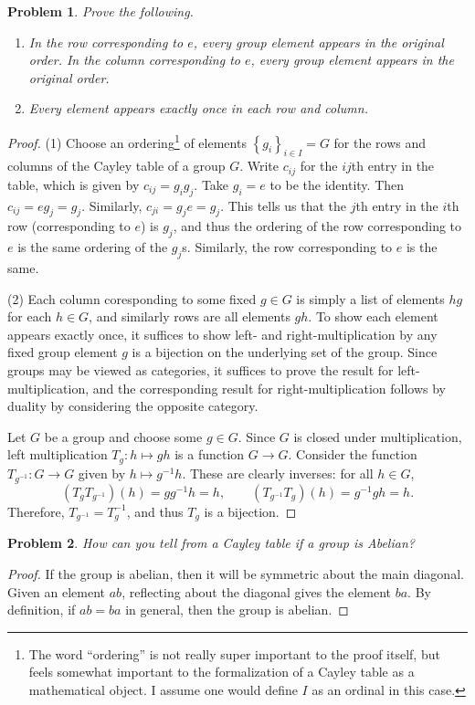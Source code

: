 \documentclass[11pt, letterpaper]{article}
\theoremstyle{plain}
\newtheorem{problem}{Problem}[section]
\begin{document}
\begin{problem}
	Prove the following.
	\begin{enumerate}
		\item In the row corresponding to $e$, every group element appears in the original order. In the column corresponding to $e$, every group element appears in the original order.
		\item Every element appears exactly once in each row and column.
	\end{enumerate}
\end{problem}
\begin{proof}
	(1) Choose an ordering\footnote{The word ``ordering'' is not really super important to the proof itself, but feels somewhat important to the formalization of a Cayley table as a mathematical object. I assume one would define $I$ as an ordinal in this case.} of elements $\left\{ g_i \right\}_{i\in I} =G$ for the rows and columns of the Cayley table of a group $G$. Write $c_{ij} $ for the $ij$th entry in the table, which is given by $c_{ij} =g_ig_j$. Take $g_i=e$ to be the identity. Then $c_{ij} =eg_j=g_j$. Similarly, $c_{ji} =g_je=g_j$. This tells us that the $j$th entry in the $i$th row (corresponding to $e$) is $g_j$, and thus the ordering of the row corresponding to $e$ is the same ordering of the $g_j$s. Similarly, the row corresponding to $e$ is the same.

	(2) Each column coresponding to some fixed $g\in G$ is simply a list of elements $hg$ for each $h\in G$, and similarly rows are all elements $gh$. To show each element appears exactly once, it suffices to show left- and right-multiplication by any fixed group element $g$ is a bijection on the underlying set of the group. Since groups may be viewed as categories, it suffices to prove the result for left-multiplication,  and the corresponding result for right-multiplication follows by duality by considering the opposite category.

	Let $G$ be a group and choose some $g\in G$. Since $G$ is closed under multiplication, left multiplication $T_g : h\mapsto gh$ is a function $G\to G$. Consider the function $T_{g^{-1} } : G \to G$ given by $h\mapsto g^{-1} h$. These are clearly inverses: for all $h\in G$,
	\[
		(T_gT_{g^{-1} } )(h)=gg^{-1} h=h,\qquad (T_{g^{-1} } T_g)(h)=g^{-1} gh=h
	.\]
	Therefore, $T_{g^{-1} } =T_g^{-1} $, and thus $T_g$ is a bijection.
\end{proof}


\begin{problem}
	How can you tell from a Cayley table if a group is Abelian?
\end{problem}
\begin{proof}
	If the group is abelian, then it will be symmetric about the main diagonal. Given an element $ab$, reflecting about the diagonal gives the element $ba$. By definition, if $ab=ba$ in general, then the group is abelian.
\end{proof}
\end{document}
